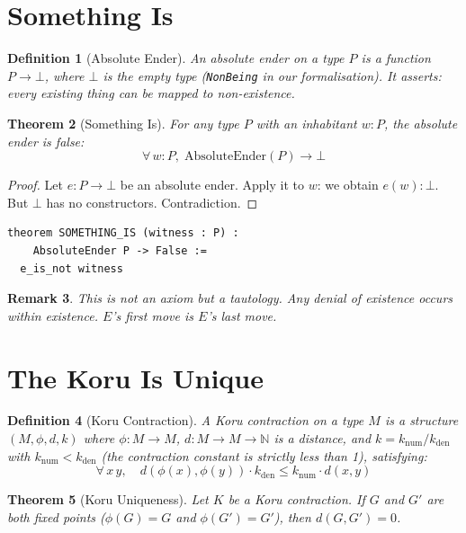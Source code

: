 \documentclass[12pt,a4paper]{article}
\newtheorem{theorem}{Theorem}[section]
\newtheorem{definition}[theorem]{Definition}
\newtheorem{remark}[theorem]{Remark}
\begin{document}
\section{Something Is}

\begin{definition}[Absolute Ender]
An \emph{absolute ender} on a type $P$ is a function $P \to \bot$,
where $\bot$ is the empty type (\texttt{NonBeing} in our formalisation).
It asserts: every existing thing can be mapped to non-existence.
\end{definition}

\begin{theorem}[Something Is]\label{thm:something-is}
For any type $P$ with an inhabitant $w : P$, the absolute ender is false:
\[
  \forall\, w : P,\; \mathrm{AbsoluteEnder}(P) \to \bot
\]
\end{theorem}

\begin{proof}
Let $e : P \to \bot$ be an absolute ender. Apply it to $w$: we obtain
$e(w) : \bot$. But $\bot$ has no constructors. Contradiction.
\end{proof}

\begin{lstlisting}[caption={Lean proof of Something Is}]
theorem SOMETHING_IS (witness : P) :
    AbsoluteEnder P -> False :=
  e_is_not witness
\end{lstlisting}

\begin{remark}
This is not an axiom but a tautology. Any denial of existence occurs
within existence. $E$'s first move is $E$'s last move.
\end{remark}

\section{The Koru Is Unique}

\begin{definition}[Koru Contraction]
A \emph{Koru contraction} on a type $M$ is a structure $(M, \phi, d, k)$
where $\phi : M \to M$, $d : M \to M \to \mathbb{N}$ is a distance,
and $k = k_{\mathrm{num}} / k_{\mathrm{den}}$ with $k_{\mathrm{num}} < k_{\mathrm{den}}$
(the contraction constant is strictly less than 1), satisfying:
\[
  \forall\, x\, y,\quad d(\phi(x), \phi(y)) \cdot k_{\mathrm{den}} \leq k_{\mathrm{num}} \cdot d(x, y)
\]
\end{definition}

\begin{theorem}[Koru Uniqueness]\label{thm:koru-unique}
Let $K$ be a Koru contraction. If $G$ and $G'$ are both fixed points
($\phi(G) = G$ and $\phi(G') = G'$), then $d(G, G') = 0$.
\end{theorem}
\end{document}
